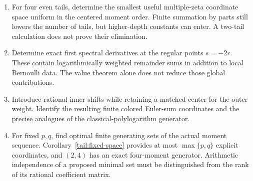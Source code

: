 \begin{enumerate}
\item For four even tails, determine the smallest useful
multiple-zeta coordinate space uniform in the centered moment
order. Finite summation by parts still lowers the number of tails,
but higher-depth constants can enter. A two-tail calculation does
not prove their elimination.
\item Determine exact first spectral derivatives at the regular
points \(s=-2r\). These contain logarithmically weighted remainder
sums in addition to local Bernoulli data. The value theorem alone
does not reduce those global contributions.
\item Introduce rational inner shifts while retaining a matched
center for the outer weight. Identify the resulting finite
colored Euler-sum coordinates and the precise analogues of the
classical-polylogarithm generator.
\item For fixed \(p,q\), find optimal finite generating sets of
the actual moment sequence. Corollary~\ref{tail:fixed-space}
provides at most \(\max\{p,q\}\) explicit coordinates, and
\((2,4)\) has an exact four-moment generator. Arithmetic
independence of a proposed minimal set must be distinguished from
the rank of its rational coefficient matrix.
\end{enumerate}


